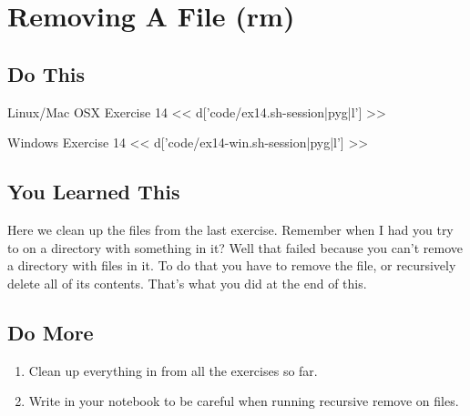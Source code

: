 \chapter{Removing A File (rm)}

\section{Do This}

\begin{code}{Linux/Mac OSX Exercise 14}
<< d['code/ex14.sh-session|pyg|l'] >>
\end{code}

\begin{code}{Windows Exercise 14}
<< d['code/ex14-win.sh-session|pyg|l'] >>
\end{code}

\section{You Learned This}

Here we clean up the files from the last exercise.  Remember when I had you
try to  on a directory with something in it?  Well that failed
because you can't remove a directory with files in it.  To do that you have
to remove the file, or recursively delete all of its contents.  That's what you did at the
end of this.

\section{Do More}

\begin{enumerate}
\item Clean up everything in  from all the exercises so far.
\item Write in your notebook to be careful when running recursive
    remove on files.
\end{enumerate}

